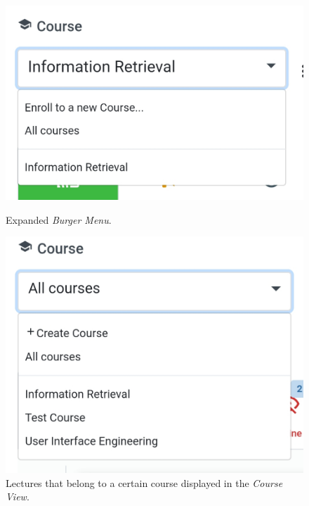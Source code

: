 \begin{figure}
	\centering
	\begin{minipage}[t]{.5\textwidth}
		\centering
		\includegraphics[width=0.95\linewidth]{screenshots/redesign/drop_down_student.jpg}
		\captionsetup{width=.8\linewidth}
		\caption{Expanded \emph{Burger Menu}.}
		\label{fig:drop_down_student}
	\end{minipage}%
	\begin{minipage}[t]{.5\textwidth}
		\centering
		\includegraphics[width=0.95\linewidth]{screenshots/redesign/drop_down_lecturer.jpg}
		\captionsetup{width=.8\linewidth}
		\caption{Lectures that belong to a certain course displayed in the \emph{Course View}.}
		\label{fig:drop_down_lecturer}
	\end{minipage}
\end{figure}

